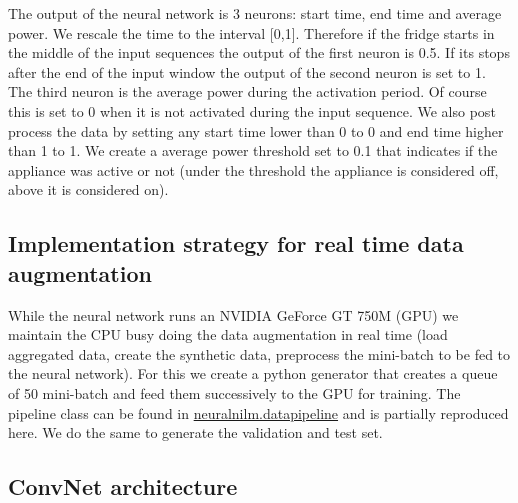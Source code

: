 \documentclass[10pt]{article}
\begin{document}
The output of the neural network is 3 neurons: start time, end time and average power. We rescale the time to the interval [0,1]. Therefore if the fridge starts in the middle of the input sequences the output of the first neuron is 0.5. If its stops after the end of the input window the output of the second neuron is set to 1. The third neuron is the average power during the activation period. Of course this is set to 0 when it is not activated during the input sequence. We also post process the data by setting any start time lower than 0 to 0 and end time higher than 1 to 1. We create a average power threshold set to 0.1 that indicates if the appliance was active or not (under the threshold the appliance is considered off, above it is considered on).

\subsection{Implementation strategy for real time data augmentation}
While the neural network runs an NVIDIA GeForce GT 750M (GPU) we maintain the CPU busy doing the data augmentation in real time (load aggregated data, create the synthetic data, preprocess the mini-batch to be fed to the neural network). For this we create a python generator that creates a queue of 50 mini-batch and feed them successively to the GPU for training.
The pipeline class can be found in \href{https://github.com/tperol/neuralnilm}{neuralnilm.datapipeline} and is partially reproduced here. We do the same to generate the validation and test set.

\subsection{ConvNet architecture}
\end{document}
